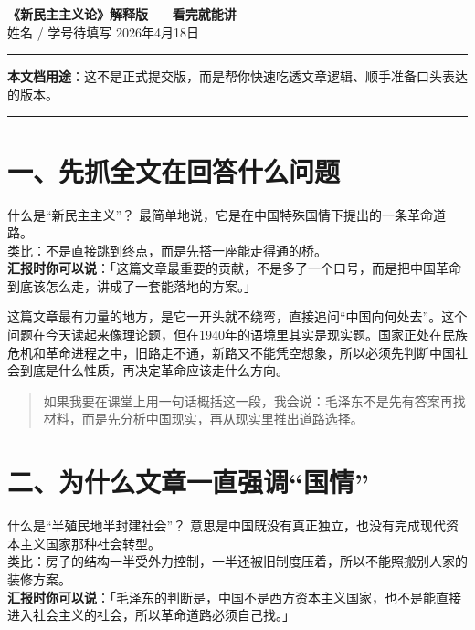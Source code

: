 \documentclass[12pt,a4paper,landscape]{article}
\begin{document}
\begin{center}
  {\LARGE\bfseries 《新民主主义论》解释版 — 看完就能讲}\\[8pt]
  {\large 姓名 / 学号待填写 \quad 2026年4月18日}
\end{center}
\vspace{4mm}
\noindent\rule{\textwidth}{0.4pt}
\noindent\parbox{\textwidth}{\textbf{本文档用途}：这不是正式提交版，而是帮你快速吃透文章逻辑、顺手准备口头表达的版本。}
\noindent\rule{\textwidth}{0.4pt}
\vspace{4mm}

\section*{一、先抓全文在回答什么问题}

\begin{termbox}{什么是“新民主主义”？}
最简单地说，它是在中国特殊国情下提出的一条革命道路。\\[2pt]
类比：不是直接跳到终点，而是先搭一座能走得通的桥。\\[2pt]
\textbf{汇报时你可以说}：「这篇文章最重要的贡献，不是多了一个口号，而是把中国革命到底该怎么走，讲成了一套能落地的方案。」
\end{termbox}

这篇文章最有力量的地方，是它一开头就不绕弯，直接追问“中国向何处去”。这个问题在今天读起来像理论题，但在1940年的语境里其实是现实题。国家正处在民族危机和革命进程之中，旧路走不通，新路又不能凭空想象，所以必须先判断中国社会到底是什么性质，再决定革命应该走什么方向。

\begin{quote}\kaishu
如果我要在课堂上用一句话概括这一段，我会说：毛泽东不是先有答案再找材料，而是先分析中国现实，再从现实里推出道路选择。
\end{quote}

\section*{二、为什么文章一直强调“国情”}

\begin{termbox}{什么是“半殖民地半封建社会”？}
意思是中国既没有真正独立，也没有完成现代资本主义国家那种社会转型。\\[2pt]
类比：房子的结构一半受外力控制，一半还被旧制度压着，所以不能照搬别人家的装修方案。\\[2pt]
\textbf{汇报时你可以说}：「毛泽东的判断是，中国不是西方资本主义国家，也不是能直接进入社会主义的社会，所以革命道路必须自己找。」
\end{termbox}
\end{document}
